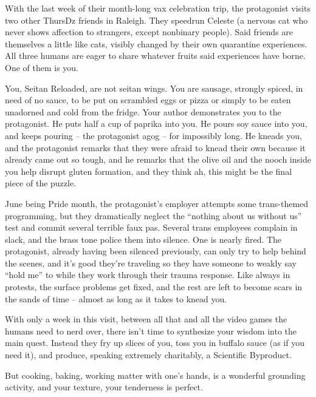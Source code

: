 \documentclass[12pt]{article}
\begin{document}
With the last week of their month-long vax celebration trip,
the protagonist visits two other ThursDz friends in Raleigh.
They speedrun Celeste (a nervous cat who never shows affection to strangers, except nonbinary people).
Said friends are themselves a little like cats, visibly changed by their own quarantine experiences.
All three humans are eager to share whatever fruits said experiences have borne.
One of them is you.

You, Seitan Reloaded, are not seitan wings.
You are sausage, strongly spiced, in need of no sauce,
to be put on scrambled eggs or pizza or simply to be eaten unadorned and cold from the fridge.
Your author demonstrates you to the protagonist.
He puts half a cup of paprika into you.
He pours soy sauce into you, and keeps pouring -- the protagonist agog -- for impossibly long.
He kneads you,
and the protagonist remarks that they were afraid to knead their own because it already came out so tough,
and he remarks that the olive oil and the nooch inside you help disrupt gluten formation,
and they think ah, this might be the final piece of the puzzle.

June being Pride month,
the protagonist's employer attempts some trans-themed programming,
but they dramatically neglect the ``nothing about us without us'' test
and commit several terrible faux pas.
Several trans employees complain in slack,
and the brass tone police them into silence.
One is nearly fired.
The protagonist, already having been silenced previously,
can only try to help behind the scenes,
and it's good they're traveling so they have someone to weakly say ``hold me'' to
while they work through their trauma response.
Like always in protests, the surface problems get fixed, and the rest are left to become scars in the sands of time -- almost as long as it takes to knead you.

With only a week in this visit, between all that and all the video games the humans need to nerd over, there isn't time to synthesize your wisdom into the main quest.
Instead they fry up slices of you, toss you in buffalo sauce (as if you need it),
and produce, speaking extremely charitably, a Scientific Byproduct.

But cooking, baking, working matter with one's hands, is a wonderful grounding activity,
and your texture, your tenderness is perfect.

\end{document}
